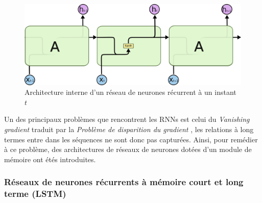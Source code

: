 		\begin{figure}[H]
			\centering
			
			\includegraphics[width=0.5\linewidth]{images/notions/rnns_unrolled_online.png}
			\caption{Architecture interne d'un réseau de neurones récurrent à un instant $t$ \cite{rnns_online}}
		\end{figure}
		\par 
		Un des principaux problèmes que rencontrent les RNNs est celui du \textit{Vanishing gradient} traduit par la \textit{Problème de disparition du gradient} \cite{vanishing_gradient}, les relations à long termes entre dans les séquences ne sont donc pas capturées. Ainsi, pour remédier à ce problème, des architectures de réseaux de neurones dotées d'un module de mémoire ont étés introduites.
		
		\subsubsection{Réseaux de neurones récurrents à mémoire court et long terme (LSTM)}
